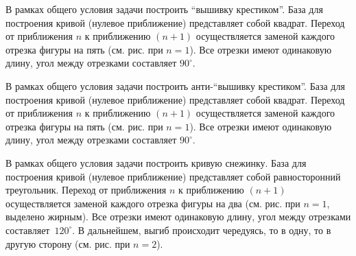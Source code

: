 
\begin{zztask}
В рамках общего условия задачи построить ``вышивку крестиком''.
База для построения кривой (нулевое приближение) представляет собой квадрат.
Переход от приближения $n$ к приближению $(n+1)$ осуществляется заменой каждого 
отрезка фигуры на пять (см. рис. при $n=1$). 
Все отрезки имеют одинаковую длину, угол между отрезками составляет $90^\circ$.
\par
\end{zztask}


\begin{zztask}
В рамках общего условия задачи построить анти-``вышивку крестиком''.
База для построения кривой (нулевое приближение) представляет собой квадрат.
Переход от приближения $n$ к приближению $(n+1)$ осуществляется заменой каждого 
отрезка фигуры на пять (см. рис. при $n=1$). 
Все отрезки имеют одинаковую длину, угол между отрезками составляет $90^\circ$.
\par
\end{zztask}


\begin{zztask}
В рамках общего условия задачи построить кривую снежинку. База для построения
кривой (нулевое приближение) представляет собой равносторонний треугольник.
Переход от приближения
$n$ к приближению $(n+1)$ осуществляется заменой каждого отрезка фигуры на два
(см. рис. при $n=1$, выделено жирным). Все отрезки
имеют одинаковую длину, угол между отрезками \mbox{составляет $120^\circ$}.
В дальнейшем, выгиб происходит чередуясь, то в одну, то в другую сторону 
(см. рис. при $n=2$).
\par
\end{zztask}


